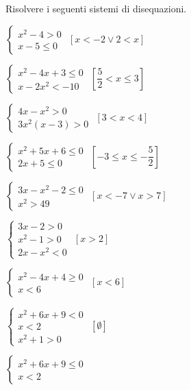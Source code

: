 \begin{esercizio}[*]
 \label{ese:4.75}
Risolvere i seguenti sistemi di disequazioni.
\begin{htmulticols}{2}
\begin{enumeratea}
\item \(\left\{\begin{array}{l}x^2-4>0\\x-5\le 0\end{array}\right.\) 
 \hfill \(\left[x<-2\vee 2<x\right]\)
\item \(\left\{\begin{array}{l}x^2-4x+3\le 0\\x-2x^2<-10\end{array}\right.\)
 \hfill \(\left[\dfrac 5 2<x\le 3\right]\)
\item \(\left\{\begin{array}{l}4x-x^2>0\\3x^2(x-3)>0\end{array}\right.\)
 \hfill \(\left[3<x<4\right]\)
\item \(\left\{\begin{array}{l}x^2+5x+6\le 0\\2x+5\le 0\end{array}\right.\)
 \hfill \(\left[-3\le x\le -\dfrac 5 2\right]\)
\item \(\left\{\begin{array}{l}3x-x^2-2\le 0\\x^2>49\end{array}\right.\)
 \hfill \(\left[x<-7\vee x>7\right]\)
\item \(\left\{\begin{array}{l}3x-2>0\\x^2-1>0\\2x-x^2<0\end{array}\right.\)
 \hfill \(\left[x>2\right]\)
\item \(\left\{\begin{array}{l}x^2-4x+4\ge 0\\x<6\end{array}\right.\)
 \hfill \(\left[x<6\right]\)
\item \(\left\{\begin{array}{l}x^2+6x+9<0\\x<2\\x^2+1>0\end{array}\right.\)
 \hfill \(\left[\emptyset\right]\)
\item \(\left\{\begin{array}{l}x^2+6x+9\le 0\\x<2\end{array}\right.\)

\end{enumeratea}
\end{htmulticols}
\end{esercizio}
